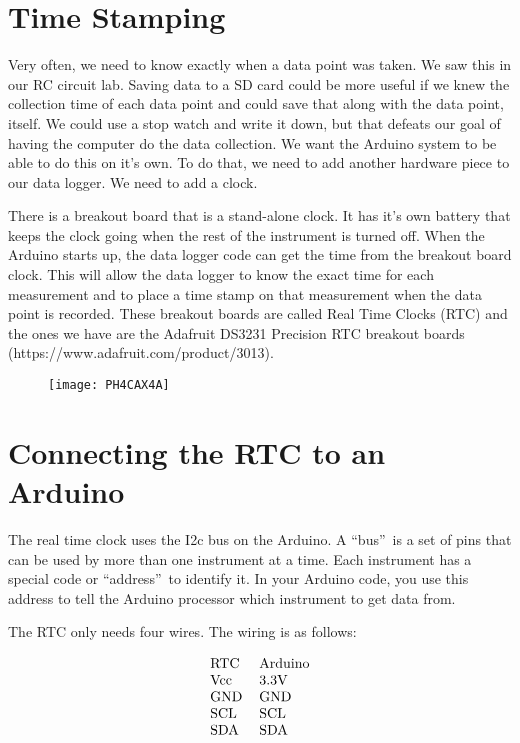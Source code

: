 \section{Time Stamping}

Very often, we need to know exactly when a data point was taken. We saw this in our RC circuit lab. Saving data to a SD card could be more useful if we knew the collection time of each data point and could save that along with the data point, itself. We could use a stop watch and write it down, but that defeats our goal of having the computer do the data collection. We want the Arduino system to be able to do this on it's own. To do that, we need to add another hardware piece to our data logger. We need to add a clock. 

There is a breakout board that is a stand-alone clock. It has it's own battery that keeps the clock going when the rest of the instrument is turned off. When the Arduino starts up, the data logger code can get the time from the breakout board clock. This will allow the data logger to know the exact time for each measurement and to place a time stamp on that measurement when the data point is recorded. These breakout boards are called Real Time Clocks (RTC) and the ones we have are the Adafruit DS3231 Precision RTC breakout boards (https://www.adafruit.com/product/3013).
\begin{figure}[h!]
\texttt{[image: PH4CAX4A]}
\end{figure}

\section{Connecting the RTC to an Arduino}

The real time clock uses the I2c bus on the Arduino. A \textquotedblleft bus\textquotedblright\ is a set of pins that can be used by more than one instrument at a time. Each instrument has a special code or \textquotedblleft address\textquotedblright\ to identify it. In your Arduino code, you use this address to tell the Arduino processor which instrument to get data from.

The RTC only needs four wires. The wiring is as follows:

\begin{equation*}
\begin{tabular}{ll}
RTC & Arduino \\ 
Vcc & 3.3V \\ 
GND & GND \\ 
SCL & SCL \\ 
SDA & SDA%
\end{tabular}%
\end{equation*}

